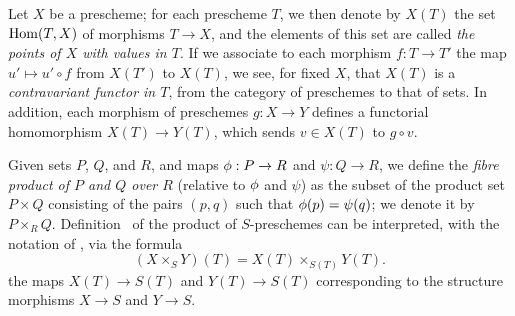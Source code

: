 \begin{env}[3.4.1]
\label{1.3.4.1}
Let $X$ be a prescheme; for each prescheme $T$, we then denote by $X(T)$ the set
${\mathop{\mathrm{Hom}}\nolimits}(T,X)$ of morphisms $T\to X$, and the elements of this set are called
\emph{the points of $X$ with values in $T$}. If we associate to each morphism
$f:T\to T'$ the map $u'\mapsto u'\circ f$ from $X(T')$ to $X(T)$, we see,
for fixed $X$, that $X(T)$ is a \emph{contravariant functor in $T$}, from the
category of preschemes to that of sets. In addition, each morphism of preschemes
$g:X\to Y$ defines a functorial homomorphism $X(T)\to Y(T)$, which sends
$v\in X(T)$ to $g\circ v$.
\end{env}

\begin{env}[3.4.2]
\label{1.3.4.2}
Given sets $P$, $Q$, and $R$, and maps $\vphi:P\to R$ and $\psi:Q\to R$, we define the
\emph{fibre product of $P$ and $Q$ over $R$} (relative to $\phi$ and $\psi$) as the subset
of
the product set $P\times Q$ consisting of the pairs $(p,q)$ such that $\phi(p)=\psi(q)$; we
denote it by $P\times_R Q$. Definition~ of the product
of $S$-preschemes can be interpreted, with the notation of ,
via the formula
\begin{equation*}
\label{1.3.4.2.1}
  (X\times_S Y)(T)=X(T)\times_{S(T)}Y(T).
  \tag{3.4.2.1}
\end{equation*}
the maps $X(T)\to S(T)$ and $Y(T)\to S(T)$ corresponding to the structure morphisms
$X\to S$ and $Y\to S$.
\end{env}

